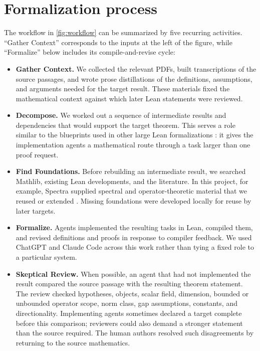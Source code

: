 \documentclass{article}
\begin{document}
\section{Formalization process}
\label{sec:system}

The workflow in \cref{fig:workflow} can be summarized by five recurring
activities.  ``Gather Context'' corresponds to the inputs at the left of the
figure, while ``Formalize'' below includes its compile-and-revise cycle:

\begin{itemize}
\setlength{\itemsep}{0.25em}
\item \textbf{Gather Context.}  We collected the relevant PDFs, built
  transcriptions of the source passages, and wrote prose distillations of the
  definitions, assumptions, and arguments needed for the target result.  These
  materials fixed the mathematical context against which later Lean statements
  were reviewed.

\item \textbf{Decompose.}  We worked out a sequence of intermediate results and
  dependencies that would support the target theorem.  This serves a role similar
  to the blueprints used in other large Lean formalizations
  \citep{liquidblueprint2023,pfrblueprint2024,zhu2026leanarchitect}: it gives the
  implementation agents a mathematical route through a task larger than one
  proof request.

\item \textbf{Find Foundations.}  Before rebuilding an intermediate result, we
  searched Mathlib, existing Lean developments, and the literature.  In this
  project, for example, Spectra supplied spectral and operator-theoretic material
  that we reused or extended \citep{bornemann2026spectra}.  Missing foundations
  were developed locally for reuse by later targets.

\item \textbf{Formalize.}  Agents implemented the resulting tasks in Lean,
  compiled them, and revised definitions and proofs in response to compiler
  feedback.  We used ChatGPT and Claude Code across this work rather than tying
  a fixed role to a particular system.

\item \textbf{Skeptical Review.}  When possible, an agent that had not implemented
  the result compared the source passage with the resulting theorem statement.
  The review checked hypotheses, objects, scalar field, dimension, bounded or
  unbounded operator scope, norm class, gap assumptions, constants, and
  directionality.  Implementing agents sometimes declared a target complete
  before this comparison; reviewers could also demand a stronger statement than
  the source required.  The human authors resolved such disagreements by
  returning to the source mathematics.
\end{itemize}
\end{document}
